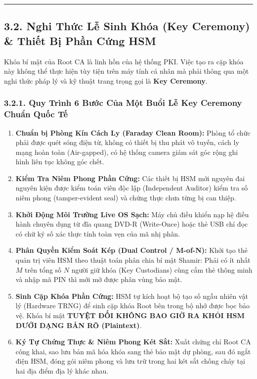 \documentclass[
]{article}
\providecommand{\tightlist}{%
  \setlength{\itemsep}{0pt}\setlength{\parskip}{0pt}}
\begin{document}
\begin{center}\rule{0.5\linewidth}{0.5pt}\end{center}

\subsection{3.2. Nghi Thức Lễ Sinh Khóa (Key Ceremony) \& Thiết Bị Phần
Cứng
HSM}\label{nghi-thux1ee9c-lux1ec5-sinh-khuxf3a-key-ceremony-thiux1ebft-bux1ecb-phux1ea7n-cux1ee9ng-hsm}

Khóa bí mật của Root CA là linh hồn của hệ thống PKI. Việc tạo ra cặp
khóa này không thể thực hiện tùy tiện trên máy tính cá nhân mà phải
thông qua một nghi thức pháp lý và kỹ thuật trang trọng gọi là
\textbf{Key Ceremony}.

\subsubsection{3.2.1. Quy Trình 6 Bước Của Một Buổi Lễ Key Ceremony
Chuẩn Quốc
Tế}\label{quy-truxecnh-6-bux1b0ux1edbc-cux1ee7a-mux1ed9t-buux1ed5i-lux1ec5-key-ceremony-chuux1ea9n-quux1ed1c-tux1ebf}

\begin{enumerate}
\def\labelenumi{\arabic{enumi}.}
\tightlist
\item
  \textbf{Chuẩn bị Phòng Kín Cách Ly (Faraday Clean Room):} Phòng tổ
  chức phải được quét sóng điện từ, không có thiết bị thu phát vô tuyến,
  cách ly mạng hoàn toàn (Air-gapped), có hệ thống camera giám sát góc
  rộng ghi hình liên tục không góc chết.
\item
  \textbf{Kiểm Tra Niêm Phong Phần Cứng:} Các thiết bị HSM mới nguyên
  đai nguyên kiện được kiểm toán viên độc lập (Independent Auditor) kiểm
  tra số niêm phong (tamper-evident seal) và chứng thực chưa từng bị can
  thiệp.
\item
  \textbf{Khởi Động Môi Trường Live OS Sạch:} Máy chủ điều khiển nạp hệ
  điều hành chuyên dụng từ đĩa quang DVD-R (Write-Once) hoặc thẻ USB chỉ
  đọc có chữ ký số xác thực tính toàn vẹn của mã nhị phân.
\item
  \textbf{Phân Quyền Kiểm Soát Kép (Dual Control / M-of-N):} Khởi tạo
  thẻ quản trị viên HSM theo thuật toán phân chia bí mật Shamir: Phải có
  ít nhất \(M\) trên tổng số \(N\) người giữ khóa (Key Custodians) cùng
  cắm thẻ thông minh và nhập mã PIN thì mới mở được phân vùng bảo mật.
\item
  \textbf{Sinh Cặp Khóa Phần Cứng:} HSM tự kích hoạt bộ tạo số ngẫu
  nhiên vật lý (Hardware TRNG) để sinh cặp khóa Root bên trong bộ nhớ
  được bọc bảo vệ. Khóa bí mật \textbf{TUYỆT ĐỐI KHÔNG BAO GIỜ RA KHỎI
  HSM DƯỚI DẠNG BẢN RÕ (Plaintext)}.
\item
  \textbf{Ký Tự Chứng Thực \& Niêm Phong Két Sắt:} Xuất chứng chỉ Root
  CA công khai, sao lưu bản mã hóa khóa sang thẻ bảo mật dự phòng, sau
  đó ngắt điện HSM, đóng gói niêm phong và lưu trữ trong hai két sắt
  chống cháy tại hai địa điểm địa lý khác nhau.
\end{enumerate}
\end{document}
